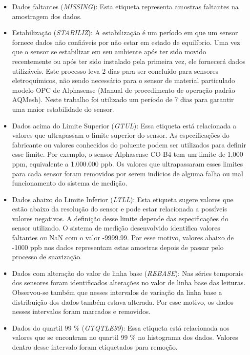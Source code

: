 \begin{itemize}
    \item Dados faltantes (\textit{MISSING}): Esta etiqueta representa amostras faltantes na amostragem dos dados.
    \item Estabilização (\textit{STABILIZ}): A estabilização é um período em que um sensor fornece dados não confiáveis por não estar em estado de equilíbrio. Uma vez que o sensor se estabilizar em seu ambiente após ter sido movido recentemente ou após ter sido instalado pela primeira vez, ele fornecerá dados utilizáveis. Este processo leva 2 dias para ser concluído para sensores eletroquímicos, não sendo necessário para o sensor de material particulado modelo OPC de Alphasense (Manual de procedimento de operação padrão AQMesh). Neste trabalho foi utilizado um período de 7 dias para garantir uma maior estabilidade do sensor.
    \item Dados acima do Limite Superior (\textit{GTUL}): Essa etiqueta está relacionada a valores que ultrapassam o limite superior do sensor. As especificações do fabricante ou valores conhecidos do poluente podem ser utilizados para definir esse limite. Por exemplo, o sensor Alphasense CO-B4 tem um limite de 1.000 ppm, equivalente a 1.000.000 ppb. Os valores que ultrapassaram esses limites para cada sensor foram removidos por serem indícios de alguma falha ou mal funcionamento do sistema de medição.
    \item Dados abaixo do Limite Inferior (\textit{LTLL}): Esta etiqueta sugere valores que estão abaixo da resolução do sensor e pode estar relacionada a possíveis valores negativos. A definição desse limite depende das especificações do sensor utilizado. O sistema de medição desenvolvido identifica valores faltantes ou NaN com o valor -9999.99. Por esse motivo, valores abaixo de -1000 ppb nos dados representam estas amostras depois de passar pelo processo de suavização.
    \item Dados com alteração do valor de linha base (\textit{REBASE}): Nas séries temporais dos sensores foram identificados alterações no valor de linha base das leituras. Observou-se também que nesses intervalos de variação da linha base a distribuição dos dados também estava alterada. Por esse motivo, os dados nesses intervalos foram marcados e removidos.
    \item Dados do quartil 99 \% (\textit{GTQTLE99}): Essa etiqueta está relacionada aos valores que se encontram no quartil 99 \% no histograma dos dados. Valores dentro desse intervalo foram etiquetados para remoção.

\end{itemize}
